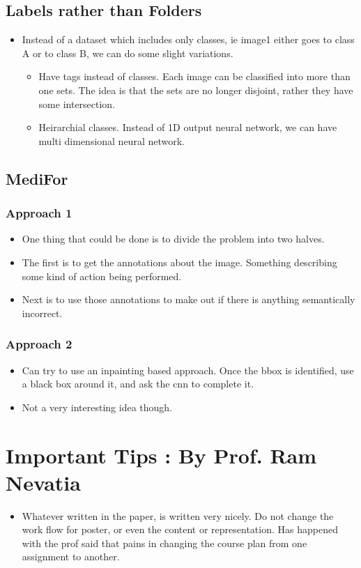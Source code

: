\documentclass{article}
\begin{document}
\subsection{Labels rather than Folders}
\begin{itemize}
\item Instead of a dataset which includes only classes, ie image1 either goes to class A or to class B, we can do some slight variations.
  \begin{itemize}
  \item Have tags instead of classes. Each image can be classified into more than one sets. The idea is that the sets are no longer disjoint, rather they have some intersection.
  \item Heirarchial classes. Instead of 1D output neural network, we can have multi dimensional neural network.
  \end{itemize}
\end{itemize}
\subsection{MediFor}
\subsubsection{Approach 1}
\begin{itemize}
\item One thing that could be done is to divide the problem into two halves.
\item The first is to get the annotations about the image. Something describing some kind of action being performed.
\item Next is to use those annotations to make out if there is anything semantically incorrect.
\end{itemize}

\subsubsection{Approach 2}
\begin{itemize}
\item Can try to use an inpainting based approach. Once the bbox is identified, use a black box around it, and ask the cnn to complete it.
\item Not a very interesting idea though.
\end{itemize}


\section{Important Tips : By Prof. Ram Nevatia}
\begin{itemize}
\item Whatever written in the paper, is written very nicely. Do not change the work flow for poster, or even the content or representation. Has happened with the prof said that pains in changing the course plan from one assignment to another. 
\end{itemize}
\end{document}
